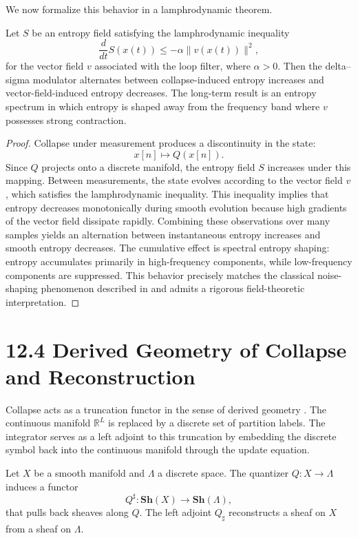 We now formalize this behavior in a lamphrodynamic theorem.

\begin{theorem}
Let $S$ be an entropy field satisfying the lamphrodynamic inequality
\[
\frac{d}{dt}S(x(t)) \leq -\alpha \|v(x(t))\|^{2},
\]
for the vector field $v$ associated with the loop filter, where $\alpha > 0$. Then the delta--sigma modulator alternates between collapse-induced entropy increases and vector-field-induced entropy decreases. The long-term result is an entropy spectrum in which entropy is shaped away from the frequency band where $v$ possesses strong contraction.
\end{theorem}

\begin{proof}
Collapse under measurement produces a discontinuity in the state:
\[
x[n] \longmapsto Q(x[n]).
\]
Since $Q$ projects onto a discrete manifold, the entropy field $S$ increases under this mapping. Between measurements, the state evolves according to the vector field $v$, which satisfies the lamphrodynamic inequality. This inequality implies that entropy decreases monotonically during smooth evolution because high gradients of the vector field dissipate rapidly. Combining these observations over many samples yields an alternation between instantaneous entropy increases and smooth entropy decreases. The cumulative effect is spectral entropy shaping: entropy accumulates primarily in high-frequency components, while low-frequency components are suppressed. This behavior precisely matches the classical noise-shaping phenomenon described in \cite{schreier2005understanding} and admits a rigorous field-theoretic interpretation.
\end{proof}

\section*{12.4 Derived Geometry of Collapse and Reconstruction}

Collapse acts as a truncation functor in the sense of derived geometry \cite{lurie2009higher}. The continuous manifold $\mathbb{R}^{L}$ is replaced by a discrete set of partition labels. The integrator serves as a left adjoint to this truncation by embedding the discrete symbol back into the continuous manifold through the update equation.

\begin{definition}
Let $X$ be a smooth manifold and $\Lambda$ a discrete space. The quantizer $Q : X \to \Lambda$ induces a functor
\[
Q^{\sharp} : \mathbf{Sh}(X) \to \mathbf{Sh}(\Lambda),
\]
that pulls back sheaves along $Q$. The left adjoint $Q_{\sharp}$ reconstructs a sheaf on $X$ from a sheaf on $\Lambda$.
\end{definition}

